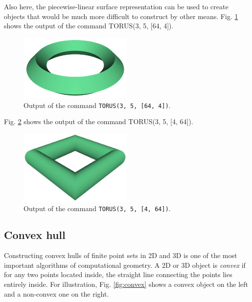 \noindent
Also here, the piecewise-linear surface representation can be used to
create objects that would be much more difficult to construct by other means.  
Fig. \ref{fig:torus-4} shows the output of the command {TORUS(3, 5, [64, 4])}.

\begin{figure}[!ht]
\begin{center}
\includegraphics[width=0.5\textwidth]{img/torus-4.png}
\end{center}
\vspace{-4mm}
\caption{Output of the command {\tt TORUS(3, 5, [64, 4])}.}
\label{fig:torus-4}
\end{figure}
\noindent
Fig. \ref{fig:torus-5} shows the output of the command {TORUS(3, 5, [4, 64])}.\\

\begin{figure}[!ht]
\begin{center}
\includegraphics[width=0.5\textwidth]{img/torus-5.png}
\end{center}
\vspace{-4mm}
\caption{Output of the command {\tt TORUS(3, 5, [4, 64])}.}
\label{fig:torus-5}
\end{figure}
\noindent

\subsection{Convex hull}

Constructing convex hulls of finite point sets in 2D and 3D is one of the 
most important algorithms of computational geometry. A 2D or 3D object is {\em convex} if for any 
two points located inside, the straight line connecting the points 
lies entirely inside. For illustration, Fig. \ref{fig:convex} 
shows a convex object on the left and a non-convex one on the right.

